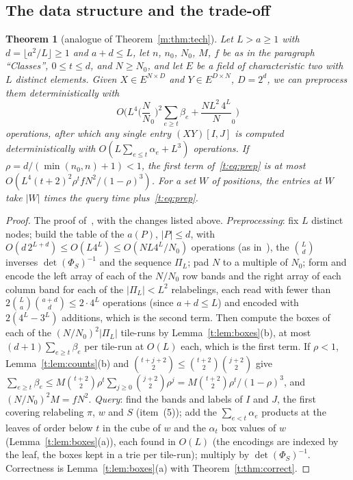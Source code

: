 \documentclass[11pt]{article}
\newtheorem{theorem}{Theorem}[section]
\theoremstyle{definition}
\theoremstyle{remark}
\newcommand{\Nz}{N_0}
\begin{document}
\subsection{The data structure and the trade-off}\label{t:sec:ds}

\begin{theorem}[analogue of Theorem~\ref{m:thm:tech}]\label{t:thm:tech}
Let $L>a\ge1$ with $d=\lfloor a^2/L\rfloor\ge1$ and $a+d\le L$, let $n$, $n_0$, $\Nz$, $M$, $f$ be as in the paragraph ``Classes'', $0\le t\le d$, and $N\ge\Nz$, and let $E$ be a field of characteristic two with $L$ distinct elements. Given $X\in E^{N\times D}$ and $Y\in E^{D\times N}$, $D=2^d$, we can preprocess them deterministically with
\begin{equation}\label{t:eq:prep}
O\Big(L^4\Big(\frac N\Nz\Big)^2\sum_{e\ge t}\beta_e+\frac{NL^2\,4^L}\Nz\Big)
\end{equation}
operations, after which any single entry $(XY)[I,J]$ is computed deterministically with $O(L\sum_{e\le t}\alpha_e+L^3)$ operations. If $\rho=d/(\min(n_0,n)+1)<1$, the first term of~\eqref{t:eq:prep} is at most $O(L^4(t+2)^2\rho^tfN^2/(1-\rho)^3)$. For a set $W$ of positions, the entries at $W$ take $|W|$ times the query time plus~\eqref{t:eq:prep}.
\end{theorem}

\begin{proof}
The proof of~\cite[Theorem~30]{ZT}, with the changes listed above. \emph{Preprocessing}: fix $L$ distinct nodes; build the table of the $a(P)$, $|P|\le d$, with $O(d\,2^{L+d})\le O(L4^L)\le O(NL4^L/\Nz)$ operations (as in~\cite[Section~4, step~0]{Maj26b}), the $\binom Ld$ inverses $\det(\Phi_S)^{-1}$ and the sequence $\Pi_L$; pad $N$ to a multiple of $\Nz$; form and encode the left array of each of the $N/\Nz$ row bands and the right array of each column band for each of the $|\Pi_L|<L^2$ relabelings, each read with fewer than $2\binom La\binom{a+d}d\le2\cdot4^L$ operations (since $a+d\le L$) and encoded with $2(4^L-3^L)$ additions, which is the second term. Then compute the boxes of each of the $(N/\Nz)^2|\Pi_L|$ tile-runs by Lemma~\ref{t:lem:boxes}(b), at most $(d+1)\sum_{e\ge t}\beta_e$ per tile-run at $O(L)$ each, which is the first term. If $\rho<1$, Lemma~\ref{t:lem:counts}(b) and $\binom{t+j+2}2\le\binom{t+2}2\binom{j+2}2$ give $\sum_{e\ge t}\beta_e\le M\binom{t+2}2\rho^t\sum_{j\ge0}\binom{j+2}2\rho^j=M\binom{t+2}2\rho^t/(1-\rho)^3$, and $(N/\Nz)^2M=fN^2$. \emph{Query}: find the bands and labels of $I$ and $J$, the first covering relabeling $\pi$, $w$ and $S$ (item~(5)); add the $\sum_{e<t}\alpha_e$ products at the leaves of order below $t$ in the cube of $w$ and the $\alpha_t$ box values of $w$ (Lemma~\ref{t:lem:boxes}(a)), each found in $O(L)$ (the encodings are indexed by the leaf, the boxes kept in a trie per tile-run); multiply by $\det(\Phi_S)^{-1}$. Correctness is Lemma~\ref{t:lem:boxes}(a) with Theorem~\ref{t:thm:correct}.
\end{proof}
\end{document}
